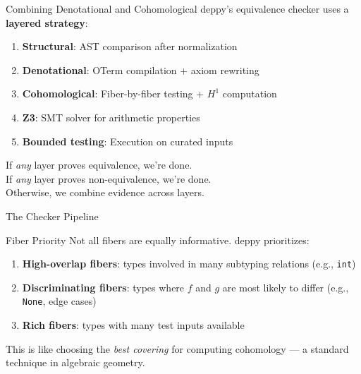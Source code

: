 \documentclass[aspectratio=169,11pt]{beamer}
\begin{document}
\begin{frame}{Combining Denotational and Cohomological}
deppy's equivalence checker uses a \textbf{layered strategy}:

\begin{enumerate}
\item \textbf{Structural}: AST comparison after normalization
\item \textbf{Denotational}: OTerm compilation + axiom rewriting
\item \textbf{Cohomological}: Fiber-by-fiber testing + $H^1$ computation
\item \textbf{Z3}: SMT solver for arithmetic properties
\item \textbf{Bounded testing}: Execution on curated inputs
\end{enumerate}

\vspace{0.5em}
If \emph{any} layer proves equivalence, we're done.\\
If \emph{any} layer proves non-equivalence, we're done.\\
Otherwise, we combine evidence across layers.
\end{frame}

\begin{frame}{The Checker Pipeline}
\begin{center}
\end{center}
\end{frame}

\begin{frame}{Fiber Priority}
Not all fibers are equally informative. deppy prioritizes:

\begin{enumerate}
\item \textbf{High-overlap fibers}: types involved in many subtyping relations (e.g., \texttt{int})
\item \textbf{Discriminating fibers}: types where $f$ and $g$ are most likely to differ (e.g., \texttt{None}, edge cases)
\item \textbf{Rich fibers}: types with many test inputs available
\end{enumerate}

\vspace{0.5em}
This is like choosing the \emph{best covering} for computing cohomology --- a standard technique in algebraic geometry.
\end{frame}
\end{document}
